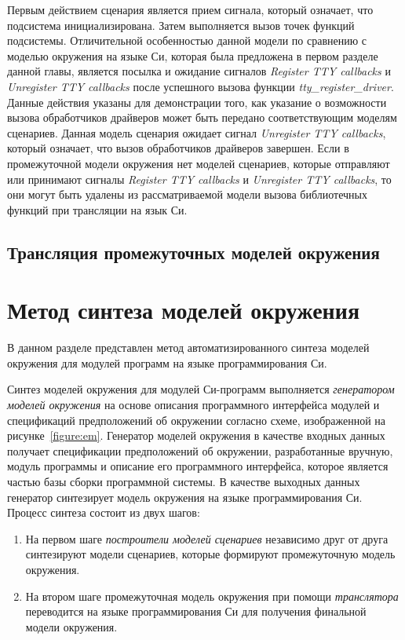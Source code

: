 Первым действием сценария является прием сигнала, который означает, что подсистема инициализирована.
Затем выполняется вызов точек функций подсистемы.
Отличительной особенностью данной модели по сравнению с моделью окружения на языке Си, которая была предложена в первом разделе данной главы, является посылка и ожидание сигналов \textit{Register TTY callbacks} и \textit{Unregister TTY callbacks} после успешного вызова функции \textit{tty\_register\_driver}.
Данные действия указаны для демонстрации того, как указание о возможности вызова обработчиков драйверов может быть передано соответствующим моделям сценариев.
Данная модель сценария ожидает сигнал \textit{Unregister TTY callbacks}, который означает, что вызов обработчиков драйверов завершен.
Если в промежуточной модели окружения нет моделей сценариев, которые отправляют или принимают сигналы \textit{Register TTY callbacks} и \textit{Unregister TTY callbacks}, то они могут быть удалены из рассматриваемой модели вызова библиотечных функций при трансляции на язык Си.

\subsection{Трансляция промежуточных моделей окружения}


\section{Метод синтеза моделей окружения}

В данном разделе представлен метод автоматизированного синтеза моделей окружения для модулей программ на языке программирования Си.

Синтез моделей окружения для модулей Си-программ выполняется \textit{генератором моделей окружения} на основе описания программного интерфейса модулей и спецификаций предположений об окружении согласно схеме, изображенной на рисунке~\ref{figure:em}.
Генератор моделей окружения в качестве входных данных получает спецификации предположений об окружении, разработанные вручную, модуль программы и описание его программного интерфейса, которое является частью базы сборки программной системы.
В качестве выходных данных генератор синтезирует модель окружения на языке программирования Си.
Процесс синтеза состоит из двух шагов:
\begin{enumerate}
    \item На первом шаге \textit{построители моделей сценариев} независимо друг от друга синтезируют модели сценариев, которые формируют промежуточную модель окружения.
    \item На втором шаге промежуточная модель окружения при помощи \textit{транслятора} переводится на языке программирования Си для получения финальной модели окружения.
\end{enumerate}

